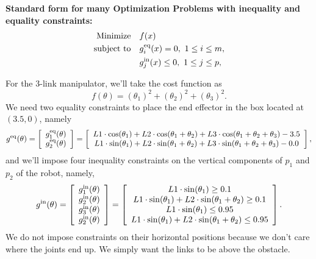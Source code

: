 \textbf{Standard form for many Optimization Problems with inequality and equality constraints:}
\begin{equation}
\label{eq:GenericMultipleConstraintOptimizationProblemWithInequality}
\begin{aligned}
\text{Minimize} \quad & f(x)\\
\text{subject to} \quad & g^{\rm eq}_i(x) = 0, ~ 1\le i \le m,\\
        \quad & g^{\rm in}_j(x) \le 0, ~ 1\le j \le p,
\end{aligned}    
\end{equation}

For the 3-link manipulator, we'll take the cost function as 
$$f(\theta) = \left(\theta_1\right)^2 + \left(\theta_2\right)^2 + \left(\theta_3\right)^2.$$
We need two equality constraints to place the end effector in the box located at $(3.5, 0)$, namely
\begin{align*}
    g^{\rm eq}(\theta) = \left[ \begin{array}{c} 
   g^{\rm eq}_1(\theta)\\  
    g^{\rm eq}_2(\theta)
    \end{array} \right] =  \left[ \begin{array}{c} 
    L1 \cdot \cos(\theta_1) + L2 \cdot \cos(\theta_1 + \theta_2) + L3 \cdot \cos(\theta_1 + \theta_2 + \theta_3) - 3.5 \\  
    L1 \cdot \sin(\theta_1) + L2 \cdot \sin(\theta_1 + \theta_2) + L3 \cdot \sin(\theta_1 + \theta_2 + \theta_3) -0.0  \end{array} \right], 
\end{align*}
and we'll impose four inequality constraints on the vertical components of $p_1$ and $p_2$ of the robot, namely,
\begin{align*}
    g^{\rm in}(\theta) = \left[ \begin{array}{l} 
   g^{\rm in}_1(\theta)\\  
    g^{\rm in}_2(\theta) \\
       g^{\rm in}_3(\theta)\\  
    g^{\rm in}_2(\theta) \\
    \end{array} \right] =  \left[ \begin{array}{c} 
    L1 \cdot \sin(\theta_1) \ge 0.1\\  
    L1 \cdot \sin(\theta_1) + L2 \cdot \sin(\theta_1 + \theta_2) \ge 0.1  \\
     L1 \cdot \sin(\theta_1) \le 0.95\\  
    L1 \cdot \sin(\theta_1) + L2 \cdot \sin(\theta_1 + \theta_2) \le 0.95  \end{array} \right]. 
\end{align*}
We do not impose constraints on their horizontal positions because we don't care where the joints end up. We simply want the links to be above the obstacle.

